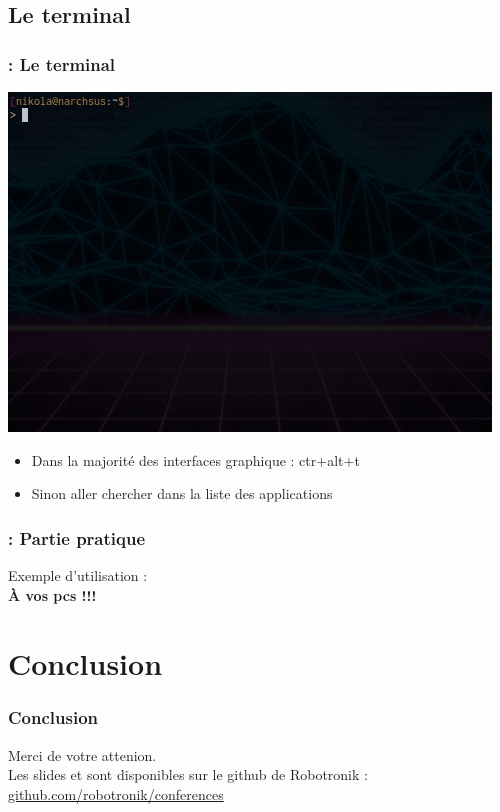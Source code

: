 \documentclass[13pt]{beamer}
\newenvironment{slide}[1]{
  \begin{frame}[environment=slide]
    \frametitle{\textbf{\insertsection}  : #1}}
{\end{frame}}
\begin{document}
\subsection{Le terminal}
\begin{slide}{Le terminal}
  \begin{center}
    \includegraphics[scale=0.4]{Images/terminal.png}
  \end{center}
  \begin{itemize}
  \item Dans la majorité des interfaces graphique : ctr+alt+t
  \item Sinon aller chercher dans la liste des applications
  \end{itemize}
\end{slide}

\begin{slide}{Partie pratique}
  \begin{center}
    \LARGE{Exemple d'utilisation :\\
      \textbf{À vos pcs !!!}}
  \end{center}
\end{slide}


\section{Conclusion}

\begin{frame}
  \frametitle{\textbf{Conclusion}}
  Merci de votre attenion.\\
  \vspace*{1cm}
  Les slides et sont disponibles sur le github de Robotronik : \url{github.com/robotronik/conferences}
\end{frame}
\end{document}
